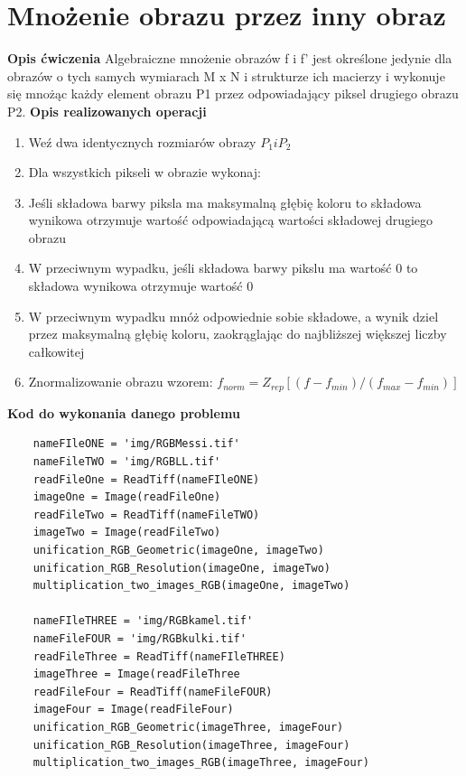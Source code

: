 \documentclass[magisterska,openany]{pracadypl}
\begin{document}
\section{Mnożenie obrazu przez inny obraz}

\vspace{0.5cm}\textbf{\Large Opis ćwiczenia}
\vspace{0.25cm}\newline
Algebraiczne mnożenie obrazów f i f’ jest określone jedynie dla obrazów o tych samych wymiarach M x N i strukturze ich macierzy i wykonuje się mnożąc każdy element obrazu P1 przez odpowiadający piksel drugiego obrazu P2.
\newline
\newline
\textbf{\Large Opis realizowanych operacji}
\begin{enumerate}
\item Weź dwa identycznych rozmiarów obrazy $P_1 i P_2$
\item Dla wszystkich pikseli w obrazie wykonaj:  
\item Jeśli składowa barwy piksla ma maksymalną głębię koloru to składowa wynikowa otrzymuje wartość odpowiadającą wartości składowej drugiego obrazu
\item W przeciwnym wypadku, jeśli składowa barwy pikslu ma wartość 0 to składowa wynikowa otrzymuje wartość 0
\item W przeciwnym wypadku mnóż odpowiednie sobie składowe, a wynik dziel przez maksymalną głębię koloru, zaokrąglając do najbliższej większej liczby całkowitej
\item Znormalizowanie obrazu wzorem:
\newline $f_{norm}=Z_{rep}[(f-f_{min})/(f_{max}-f_{min})]$
\end{enumerate}

\vspace{0.5cm}
\textbf{\Large Kod do wykonania danego problemu}
\lstset{language=Python}
\vspace{0.25cm}
\begin{lstlisting}
	nameFIleONE = 'img/RGBMessi.tif'
	nameFileTWO = 'img/RGBLL.tif'
	readFileOne = ReadTiff(nameFIleONE)
	imageOne = Image(readFileOne)
	readFileTwo = ReadTiff(nameFileTWO)
	imageTwo = Image(readFileTwo)
	unification_RGB_Geometric(imageOne, imageTwo)
	unification_RGB_Resolution(imageOne, imageTwo)
	multiplication_two_images_RGB(imageOne, imageTwo)
	
	nameFIleTHREE = 'img/RGBkamel.tif'
	nameFileFOUR = 'img/RGBkulki.tif'
	readFileThree = ReadTiff(nameFIleTHREE)
	imageThree = Image(readFileThree
	readFileFour = ReadTiff(nameFileFOUR)
	imageFour = Image(readFileFour)
	unification_RGB_Geometric(imageThree, imageFour)
	unification_RGB_Resolution(imageThree, imageFour)
	multiplication_two_images_RGB(imageThree, imageFour)

\end{lstlisting}
\end{document}
